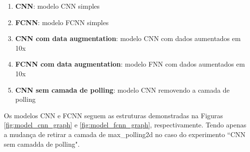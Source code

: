 \documentclass[12pt]{article}
\begin{document}
\begin{enumerate}
  \item \textbf{CNN}: modelo CNN simples
  \item \textbf{FCNN}: modelo FCNN simples 
  \item \textbf{CNN com data augmentation}: modelo CNN com dados aumentados em 10x
  \item \textbf{FCNN com data augmentation}: modelo FNN com dados aumentados em 10x
  \item \textbf{CNN sem camada de polling}: modelo CNN removendo a camada de polling
\end{enumerate}

Os modelos CNN e FCNN seguem as estruturas demonstradas na Figuras \ref{fig:model_cnn_graph} e \ref{fig:model_fcnn_graph}, respectivamente. Tendo apenas a mudança de retirar a camada de max\_polling2d no caso do experimento ``CNN sem camadda de polling".
\end{document}
